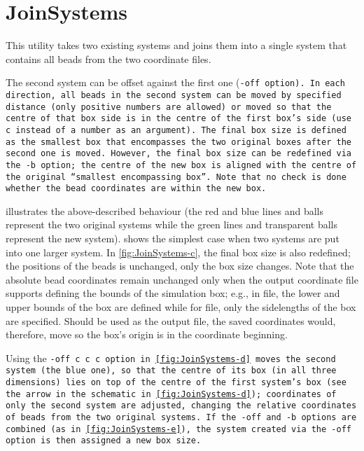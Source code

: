 \section{JoinSystems} \label{sec:JoinSystems}



This utility takes two existing systems and joins them into a single system that
contains all beads from the two coordinate files.

The second system can be offset against the first one (\tt{-off} option). In
each direction, all beads in the second system can be moved by specified
distance (only positive numbers are allowed) or moved so that the centre of that
box side is in the centre of the first box's side (use \tt{c} instead of a
number as an argument). The final box size is defined as the smallest box that
encompasses the two original boxes after the second one is moved. However, the
final box size can be redefined via the \tt{-b} option; the centre of the new
box is aligned with the centre of the original \enquote{smallest encompassing
box}. Note that no check is done whether the bead coordinates are within the new
box.

 illustrates the above-described behaviour (the red and
blue lines and balls represent the two original systems while the green lines
and transparent balls represent the new system).  shows
the simplest case when two systems are put into one larger system. In
\cref{fig:JoinSystems-c}, the final box size is also redefined; the positions of
the beads is unchanged, only the box size changes. Note that the absolute bead
coordinates remain unchanged only when the output coordinate file supports
defining the bounds of the simulation box; e.g., in \ltrj file, the lower and
upper bounds of the box are defined while for \vtf file, only the sidelengths of
the box are specified. Should \vtf be used as the output file, the saved
coordinates would, therefore, move so the box's origin is in the coordinate
beginning.

Using the \tt{-off c c c} option in \cref{fig:JoinSystems-d} moves the second
system (the blue one), so that the centre of its box (in all three dimensions)
lies on top of the centre of the first system's box (see the arrow in the
schematic in \cref{fig:JoinSystems-d}); coordinates of only the second system
are adjusted, changing the relative coordinates of beads from the two original
systems. If the \tt{-off} and \tt{-b} options are combined (as in
\cref{fig:JoinSystems-e}), the system created via the \tt{-off} option is then
assigned a new box size.

